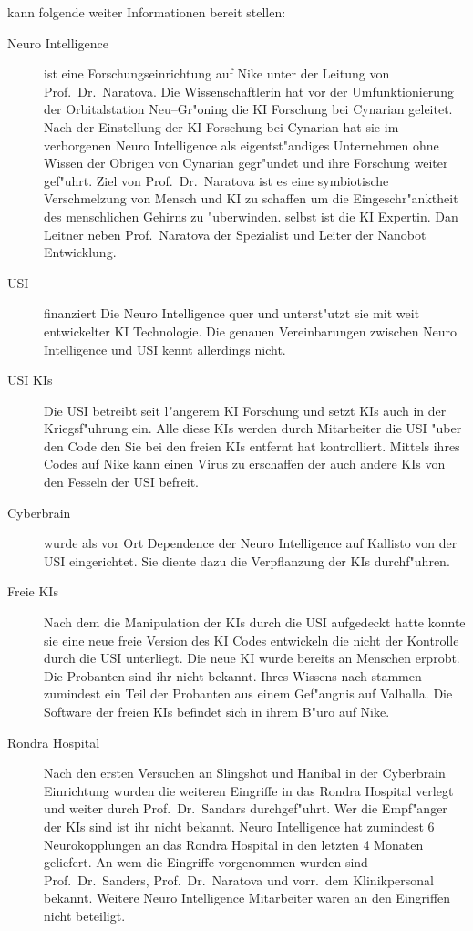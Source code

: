 \ml{} kann folgende weiter Informationen bereit stellen:

\begin{description}
	\item[Neuro Intelligence] ist eine Forschungseinrichtung auf Nike unter der Leitung von Prof.~Dr.~Naratova. Die Wissenschaftlerin hat 
		vor der Umfunktionierung der Orbitalstation Neu--Gr"oning die KI Forschung bei Cynarian geleitet. Nach der Einstellung der KI Forschung bei Cynarian hat sie im verborgenen Neuro Intelligence als eigentst"andiges Unternehmen ohne Wissen der Obrigen von Cynarian gegr"undet und ihre Forschung weiter gef"uhrt. Ziel von Prof.~Dr.~Naratova ist es eine symbiotische Verschmelzung von Mensch und KI zu schaffen um die Eingeschr"anktheit des menschlichen Gehirns zu "uberwinden. \ml{} selbst ist die KI Expertin. Dan Leitner neben Prof.~Naratova der Spezialist und Leiter der Nanobot Entwicklung.
	\item[USI] finanziert Die Neuro Intelligence quer und unterst"utzt sie mit weit entwickelter KI Technologie. Die genauen Vereinbarungen 
		zwischen Neuro Intelligence und USI kennt \ml{} allerdings nicht.
		\item[USI KIs] Die USI betreibt seit l"angerem KI Forschung und setzt KIs auch in der Kriegsf"uhrung ein. Alle diese KIs werden 
		durch Mitarbeiter die USI "uber den Code den Sie bei den freien KIs entfernt hat kontrolliert. Mittels ihres Codes auf Nike kann \ml{} einen Virus zu erschaffen der auch andere KIs von den Fesseln der USI befreit.		
	\item[Cyberbrain] wurde als vor Ort Dependence der Neuro Intelligence auf Kallisto von der USI eingerichtet. Sie diente dazu die		
		Verpflanzung der KIs durchf"uhren.
	\item[Freie KIs] Nach dem \ml{} die Manipulation der KIs durch die USI aufgedeckt hatte konnte sie eine neue freie Version des KI Codes
		entwickeln die nicht der Kontrolle durch die USI unterliegt. Die neue KI wurde bereits an Menschen erprobt. Die Probanten sind ihr nicht bekannt. Ihres Wissens nach stammen zumindest ein Teil der Probanten aus einem Gef"angnis auf Valhalla. Die Software der freien KIs befindet sich in ihrem B"uro auf Nike.
	\item[Rondra Hospital] Nach den ersten Versuchen an Slingshot und Hanibal in der Cyberbrain Einrichtung wurden die weiteren Eingriffe 	
		in das Rondra Hospital verlegt und weiter durch Prof.~Dr.~Sandars durchgef"uhrt. Wer die Empf"anger der KIs sind ist ihr nicht bekannt. Neuro Intelligence hat zumindest 6 Neurokopplungen an das Rondra Hospital in den letzten 4 Monaten geliefert. An wem die Eingriffe vorgenommen wurden sind Prof.~Dr.~Sanders, Prof.~Dr.~Naratova und vorr.~dem Klinikpersonal bekannt. Weitere Neuro Intelligence Mitarbeiter waren an den Eingriffen nicht beteiligt.
\end{description}

